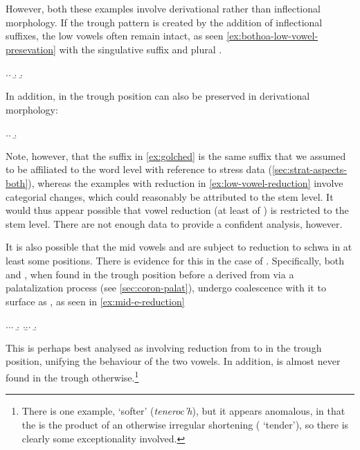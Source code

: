 However, both these examples involve derivational rather than inflectional morphology. If the trough pattern is created by the addition of inflectional suffixes, the low vowels often remain intact, as seen \cref{ex:bothoa-low-vowel-presevation} with the singulative suffix  and plural .

\ex.\label{ex:bothoa-low-vowel-presevation}\a.
\b.
\b.

In addition, \ipa{[a]} in the trough position can also be preserved in derivational morphology:

\ex.\label{ex:golched}\a.
\b.

Note, however, that the suffix  in \cref{ex:golched} is the same suffix that we assumed to be affiliated to the word level with reference to stress data (\cref{sec:strat-aspects-both}), whereas the examples with reduction in \cref{ex:low-vowel-reduction} involve categorial changes, which could reasonably be attributed to the stem level. It would thus appear possible that vowel reduction (at least of \ipa{[a]}) is restricted to the stem level. There are not enough data to provide a confident analysis, however.

It is also possible that the mid vowels \ipa{[ɛ]} and \ipa{[ɔ]} are subject to reduction to schwa in at least some positions. There is evidence for this in the case of \ipa{[ɛ]}. Specifically, both \ipa{[ə]} and \ipa{[ɛ]}, when found in the trough position before a \ipa{[j]} derived from \ipa{[l]} via a palatalization process (see \cref{sec:coron-palat}), undergo coalescence with it to surface as \ipa{[i]}, as seen in \cref{ex:mid-e-reduction}

\ex.\label{ex:mid-e-reduction}\a.\a.
\b.
\z.\b.\a.
\b.

This is perhaps best analysed as involving reduction from \ipa{[ɛ]} to \ipa{[ə]} in the trough position, unifying the behaviour of the two vowels. In addition, \ipa{[ɛ]} is almost never found in the trough otherwise.\footnote{There is one example,  `softer' (\emph{teneroc'h}), but it appears anomalous, in that the \ipa{[ɛ]} is the product of an otherwise irregular shortening (\ipa{[tãˈnɛːr]} `tender'), so there is clearly some exceptionality involved.}

